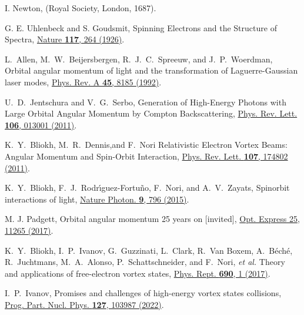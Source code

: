 \documentclass[prl,twocolumn,floatfix,amsmath,nofootinbib,superscriptaddress,amssymb,preprintnumbers,floatfix]{revtex4-1}
\begin{document}
\begin{thebibliography}{apsrev4-1}

I. Newton,
 (Royal Society, London, 1687).

G. E. Uhlenbeck and S. Goudsmit,
Spinning Electrons and the Structure of Spectra,
\href{https://www.nature.com/articles/117264a0.pdf}{Nature \textbf{117}, 264 (1926)}.

L.~Allen, M.~W.~Beijersbergen, R.~J.~C.~Spreeuw, and J.~P.~Woerdman,
Orbital angular momentum of light and the transformation of Laguerre-Gaussian laser modes,
\href{https://journals.aps.org/pra/pdf/10.1103/PhysRevA.45.8185}{Phys. Rev. A \textbf{45}, 8185 (1992)}.

U.~D.~Jentschura and V.~G.~Serbo,
Generation of High-Energy Photons with Large Orbital Angular Momentum by Compton Backscattering,
\href{https://journals.aps.org/prl/abstract/10.1103/PhysRevLett.106.013001}{Phys. Rev. Lett. \textbf{106}, 013001 (2011)}.

K.~Y.~Bliokh, M.~R.~Dennis,and F.~Nori
Relativistic Electron Vortex Beams: Angular Momentum and Spin-Orbit Interaction,
\href{https://journals.aps.org/prl/pdf/10.1103/PhysRevLett.107.174802}{Phys. Rev. Lett. \textbf{107}, 174802 (2011)}.

K.~Y.~Bliokh, F.~J.~Rodr\'\i{}guez-Fortu\~no, F.~Nori, and A.~V.~Zayats,
Spin\textendash{}orbit interactions of light,
\href{https://www.nature.com/articles/nphoton.2015.201}{Nature Photon. \textbf{9}, 796 (2015)}.

M. J. Padgett,
Orbital angular momentum 25 years on [invited],
\href{https://opg.optica.org/oe/fulltext.cfm?uri=oe-25-10-11265}{Opt. Express 25, 11265 (2017)}.

K.~Y.~Bliokh, I.~P.~Ivanov, G.~Guzzinati, L.~Clark, R.~Van Boxem, A.~B\'ech\'e, R.~Juchtmans, M.~A.~Alonso, P.~Schattschneider, and F.~Nori, \textit{et al.}
Theory and applications of free-electron vortex states,
\href{https://www.sciencedirect.com/science/article/pii/S0370157317301515?via%3Dihub}{Phys. Rept. \textbf{690}, 1 (2017)}.

I.~P.~Ivanov,
Promises and challenges of high-energy vortex states collisions,
\href{https://www.sciencedirect.com/science/article/pii/S0146641022000461?via%3Dihub}{Prog. Part. Nucl. Phys. \textbf{127}, 103987 (2022)}.


\end{thebibliography}
\end{document}
